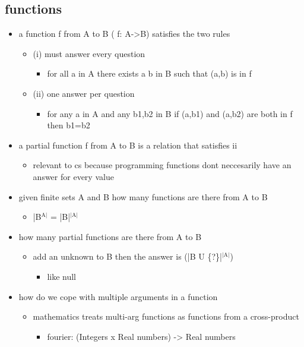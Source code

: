 \documentclass[11pt]{article}
\begin{document}
\subsection{functions}
\label{sec-1-2}
\begin{itemize}
\item a function f from A to B ( f: A->B) satisfies the two rules
\begin{itemize}
\item (i) must answer every question
\begin{itemize}
\item for all a in A there exists a b in B such that (a,b) is in f
\end{itemize}
\item (ii) one answer per question
\begin{itemize}
\item for any a in A and any b1,b2 in B if (a,b1) and (a,b2) are both in f then b1=b2
\end{itemize}
\end{itemize}
\item a partial function f from A to B is a relation that satisfies ii
\begin{itemize}
\item relevant to cs because programming functions dont neccesarily have an answer for every value
\end{itemize}
\item given finite sets A and B how many functions are there from A to B
\begin{itemize}
\item |B$^{\text{A|}}$ = |B|$^{\text{|A|}}$
\end{itemize}
\item how many partial functions are there from A to B
\begin{itemize}
\item add an unknown to B then the answer is (|B U \{?\}|$^{\text{|A|}}$)
\begin{itemize}
\item like null
\end{itemize}
\end{itemize}
\item how do we cope with multiple arguments in a function
\begin{itemize}
\item mathematics treats multi-arg functions as functions from a cross-product
\begin{itemize}
\item fourier: (Integers x Real numbers) -> Real numbers
\end{itemize}
\end{itemize}
\end{itemize}
\end{document}
